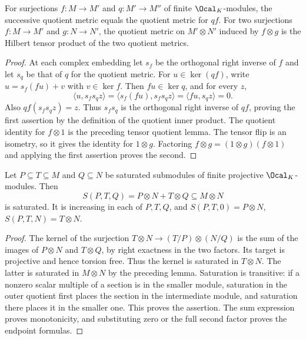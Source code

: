 \begin{lemma}
\label{lem:tensor-quotient-transport}
\leanok
For surjections $f:M\to M'$ and $q:M'\to M''$ of finite
$\Ocal_K$-modules, the successive quotient metric equals the quotient
metric for $qf$. For two surjections $f:M\to M'$ and $g:N\to N'$,
the quotient metric on $M'\otimes N'$ induced by $f\otimes g$
is the Hilbert tensor product of the two quotient metrics.
\end{lemma}
\begin{proof}
At each complex embedding let $s_f$ be the orthogonal right inverse
of $f$ and let $s_q$ be that of $q$ for the quotient metric.
For $u\in\ker(qf)$, write $u=s_f(fu)+v$ with $v\in\ker f$.
Then $fu\in\ker q$, and for every $z$,
\[
 \langle u,s_fs_qz\rangle
 =\langle s_f(fu),s_fs_qz\rangle
 =\langle fu,s_qz\rangle=0.
\]
Also $qf(s_fs_qz)=z$. Thus $s_fs_q$ is the orthogonal right
inverse of $qf$, proving the first assertion by the definition of
the quotient inner product. The quotient identity for $f\otimes1$
is the preceding tensor quotient lemma. The tensor flip is an isometry,
so it gives the identity for $1\otimes g$. Factoring
$f\otimes g=(1\otimes g)(f\otimes1)$ and applying the first assertion
proves the second.
\end{proof}

\begin{lemma}
\label{lem:tensor-refinement-saturated}
\leanok
Let $P\subseteq T\subseteq M$ and $Q\subseteq N$ be saturated
submodules of finite projective $\Ocal_K$-modules. Then
\[
 S(P,T,Q)=P\otimes N+T\otimes Q\subseteq M\otimes N
\]
is saturated. It is increasing in each of $P,T,Q$, and
$S(P,T,0)=P\otimes N$, $S(P,T,N)=T\otimes N$.
\end{lemma}
\begin{proof}
The kernel of the surjection
$T\otimes N\to(T/P)\otimes(N/Q)$ is the sum of the images of
$P\otimes N$ and $T\otimes Q$, by right exactness in the two
factors. Its target is projective and hence torsion free. Thus the
kernel is saturated in $T\otimes N$. The latter is saturated in
$M\otimes N$ by the preceding lemma. Saturation is transitive:
if a nonzero scalar multiple of a section is in the smaller module,
saturation in the outer quotient first places the section in the
intermediate module, and saturation there places it in the smaller
one. This proves the assertion. The sum expression proves
monotonicity, and substituting zero or the full second factor proves
the endpoint formulas.
\end{proof}

